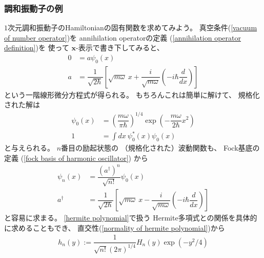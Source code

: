 \subsubsection{調和振動子の例}

$1$次元調和振動子のHamiltonianの固有関数を求めてみよう。
真空条件(\ref{vacuum of number operator})を
annihilation operatorの定義
(\ref{annihilation operator definition})を
使って
$\bm{x}$-表示で書き下してみると、
\begin{subequations}
\begin{align}
    0
    &=
    a \psi_0(x)
\\
    a
    &=
    \dfrac{1}{\sqrt{2\hbar}}
    \left[
        \sqrt{
            m\omega
        }\ x
        +
        \dfrac{i}{\sqrt{m\omega}}
        \left(
            - i \hbar \dfrac{d}{dx}
        \right)
    \right]
\end{align}
\end{subequations}
という一階線形微分方程式が得られる。
もちろんこれは簡単に解けて、
規格化された解は
\begin{subequations}
\begin{align}
    \psi_0 (x)
    &=
    \left(
        \dfrac{m \omega}{\pi \hbar}        
    \right)^{1/4}
    \exp(- \dfrac{m \omega}{2 \hbar} x^2)
\label{vacuum solution of harmonic oscillator}
\\
    1
    &=
    \int dx\ 
        \psi_0 ^* (x)
        \psi_0    (x)
\end{align}
\end{subequations}
と与えられる。
$n$番目の励起状態の
（規格化された）波動関数も、
Fock基底の定義
(\ref{fock basis of harmonic oscillator})
から
\begin{subequations}
\begin{align}
    \psi_n (x)
    &=
    \dfrac{ (a^\dagger)^n }{ \sqrt{n!} }
    \psi_0 (x)
\\
    a^\dagger
    &=
    \dfrac{1}{\sqrt{2\hbar}}
    \left[
        \sqrt{
            m\omega
        }\ x
        -
        \dfrac{i}{\sqrt{m\omega}}
        \left(
            - i \hbar \dfrac{d}{dx}
        \right)
    \right]
\end{align}
\end{subequations}
と容易に求まる。
\ref{hermite polynomial}で扱う
Hermite多項式との関係を具体的に求めることもでき、
直交性(\ref{normality of hermite polynomial})から
\begin{align}
    h_n(y)
    :=
    \dfrac{1}{ \sqrt{n!} (2\pi)^{1/4}}
    H_n(y) \exp(- y^2 / 4)
\end{align}

